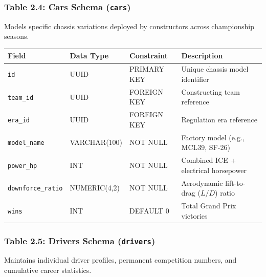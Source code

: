 \documentclass[12pt,a4paper]{report}
\begin{document}
\newpage
\subsubsection*{Table 2.4: Cars Schema (\textnormal{\texttt{cars}})}
Models specific chassis variations deployed by constructors across championship seasons.

\begin{table}[H]
\centering
\small
\begin{tabularx}{\textwidth}{l p{2.6cm} p{2.6cm} X}
\toprule
\rowcolor{gray!15}
\textbf{Field} & \textbf{Data Type} & \textbf{Constraint} & \textbf{Description} \\
\midrule
\texttt{id} & UUID & PRIMARY KEY & Unique chassis model identifier \\
\texttt{team\_id} & UUID & FOREIGN KEY & Constructing team reference \\
\texttt{era\_id} & UUID & FOREIGN KEY & Regulation era reference \\
\texttt{model\_name} & VARCHAR(100) & NOT NULL & Factory model (e.g., MCL39, SF-26) \\
\texttt{power\_hp} & INT & NOT NULL & Combined ICE + electrical horsepower \\
\texttt{downforce\_ratio} & NUMERIC(4,2) & NOT NULL & Aerodynamic lift-to-drag ($L/D$) ratio \\
\texttt{wins} & INT & DEFAULT 0 & Total Grand Prix victories \\
\bottomrule
\end{tabularx}
\end{table}

\vspace{0.3cm}
\subsubsection*{Table 2.5: Drivers Schema (\textnormal{\texttt{drivers}})}
Maintains individual driver profiles, permanent competition numbers, and cumulative career statistics.
\end{document}
